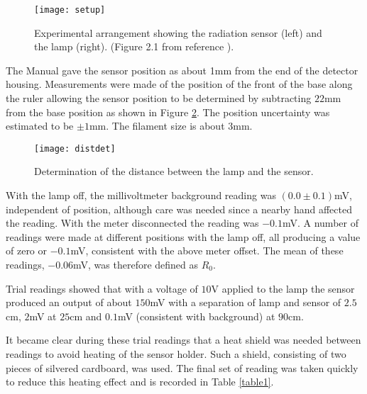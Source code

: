 \documentclass[10pt]{iopart}
\begin{document}
\begin{figure}
  \centering
  \texttt{[image: setup]}\\
  \caption{Experimental arrangement showing the radiation sensor
(left) and the lamp (right). (Figure 2.1 from reference
\cite{pasco}).}\label{setup}
\end{figure}

The Manual gave the sensor position as about 1mm from the end of
the detector housing. Measurements were made of the position of
the front of the base along the ruler allowing the sensor position
to be determined by subtracting $22$mm from the base position as
shown in Figure \ref{distdet}. The position uncertainty was
estimated to be $\pm1$mm. The filament size is about $3$mm.

\begin{figure}
  \centering
  \texttt{[image: distdet]}\\
  \caption{Determination of the distance between the lamp and the
sensor.}\label{distdet}
\end{figure}

With the lamp off, the millivoltmeter background reading was $(0.0
\pm 0.1)$mV, independent of position, although care was needed
since a nearby hand affected the reading. With the meter
disconnected the reading was $-0.1$mV. A number of readings were
made at different positions with the lamp off, all producing a
value of zero or $-0.1$mV, consistent with the above meter offset.
The mean of these readings, $-0.06$mV, was therefore defined as
$R_0$.

Trial readings showed that with a voltage of $10$V applied to the
lamp the sensor produced an output of about $150$mV with a
separation of lamp and sensor of $2.5$cm, $2$mV at $25$cm and
$0.1$mV (consistent with background) at $90$cm.

It became clear during these trial readings that a heat shield was
needed between readings to avoid heating of the sensor holder.
Such a shield, consisting of two pieces of silvered cardboard, was
used. The final set of reading was taken quickly to reduce this
heating effect and is recorded in Table \ref{table1}.
\end{document}
